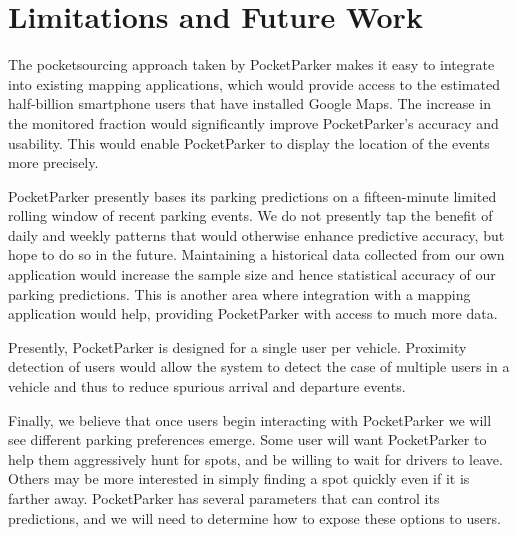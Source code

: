 \section{Limitations and Future Work}

The pocketsourcing approach taken by PocketParker makes it easy to integrate
into existing mapping applications, which would provide access to the estimated
half-billion smartphone users that have installed Google Maps. The increase in
the monitored fraction would significantly improve
PocketParker's accuracy and usability. This would enable PocketParker to display
the location of the events more precisely.

PocketParker presently bases its parking predictions on a fifteen-minute
limited rolling window of recent parking events. We do not presently tap the
benefit of daily and weekly patterns that would otherwise enhance predictive
accuracy, but hope to do so in the future. Maintaining a historical data
collected from our own application would increase
the sample size and hence statistical accuracy of our parking predictions.
This is another area where integration with a mapping application would help,
providing PocketParker with access to much more data.

Presently, PocketParker is designed for a single user per vehicle. Proximity
detection of users would allow the system to detect the case of
multiple users in a vehicle and thus to reduce spurious arrival and departure
events.

Finally, we believe that once users begin interacting with PocketParker we
will see different parking preferences emerge. Some user will want
PocketParker to help them aggressively hunt for spots, and be willing to wait
for drivers to leave. Others may be more interested in simply finding a spot
quickly even if it is farther away. PocketParker has several parameters that
can control its predictions, and we will need to determine how to expose
these options to users.

%
%
%
%
%
%
%
